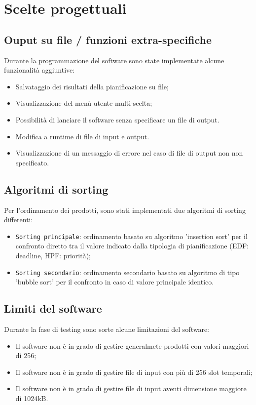\documentclass[a4paper]{report}
\begin{document}
\section{Scelte progettuali}

  \subsection{Ouput su file / funzioni extra-specifiche}
  Durante la programmazione del software sono state implementate alcune funzionalità aggiuntive:
    \begin{itemize}
      \item Salvataggio dei risultati della pianificazione su file;
      \item Visualizzazione del menù utente multi-scelta;
      \item Possibilità di lanciare il software senza specificare un file di output.
      \item Modifica a runtime di file di input e output.
      \item Visualizzazione di un messaggio di errore nel caso di file di output non non specificato.
    \end{itemize}

  \subsection{Algoritmi di sorting}
  Per l'ordinamento dei prodotti, sono stati implementati due algoritmi di sorting differenti:

    \begin{itemize}
      \item \texttt{Sorting principale}: ordinamento basato su algoritmo 'insertion sort' per il confronto diretto tra il valore indicato dalla tipologia di pianificazione (EDF: deadline, HPF: priorità);
      \item \texttt{Sorting secondario}: ordinamento secondario basato su algoritmo di tipo 'bubble sort' per il confronto in caso di valore principale identico.
    \end{itemize}
    
    \subsection{Limiti del software}
    Durante la fase di testing sono sorte alcune limitazioni del software:

      \begin{itemize}
        \item Il software non è in grado di gestire generalmete prodotti con valori maggiori di 256;
        \item Il software non è in grado di gestire file di input con più di 256 slot temporali;
        \item Il software non è in grado di gestire file di input aventi dimensione maggiore di 1024kB.
      \end{itemize}
\end{document}
